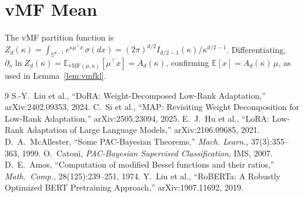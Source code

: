 \documentclass[11pt]{article}
\newcommand{\vMF}{\mathrm{vMF}}
\newcommand{\Sd}{\mathbb{S}^{d-1}}
\newcommand{\E}{\mathbb{E}}
\begin{document}
\appendix
\section{vMF Mean}\label{app:mean}
The vMF partition function is
$Z_d(\kappa)=\int_{\Sd}e^{\kappa\mu^\top x}\,\sigma(dx)=(2\pi)^{d/2}I_{d/2-1}(\kappa)/\kappa^{d/2-1}$.
Differentiating, $\partial_\kappa\ln Z_d(\kappa)=\E_{\vMF(\mu,\kappa)}[\mu^\top x]=A_d(\kappa)$,
confirming $\E[x]=A_d(\kappa)\,\mu$, as used in Lemma~\ref{lem:vmfkl}.

\begin{thebibliography}{9}
\small
{} S.-Y.\ Liu et al., ``DoRA: Weight-Decomposed Low-Rank Adaptation,''
arXiv:2402.09353, 2024.
 C.\ Si et al., ``MAP: Revisiting Weight Decomposition for Low-Rank
Adaptation,'' arXiv:2505.23094, 2025.
 E.\ J.\ Hu et al., ``LoRA: Low-Rank Adaptation of Large Language
Models,'' arXiv:2106.09685, 2021.
 D.\ A.\ McAllester, ``Some PAC-Bayesian Theorems,'' \emph{Mach.
Learn.}, 37(3):355--363, 1999.
 O.\ Catoni, \emph{PAC-Bayesian Supervised Classification}, IMS, 2007.
 D.\ E.\ Amos, ``Computation of modified Bessel functions and their
ratios,'' \emph{Math.\ Comp.}, 28(125):239--251, 1974.
 Y.\ Liu et al., ``RoBERTa: A Robustly Optimized BERT Pretraining
Approach,'' arXiv:1907.11692, 2019.
\end{thebibliography}
\end{document}

